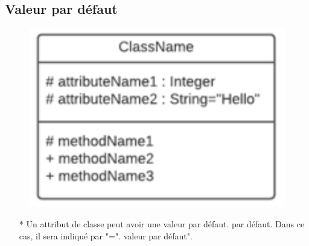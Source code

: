 \documentclass[12pt]{article}
\begin{document}
\subsection{Valeur par défaut}
\begin{figure}[!hbtp]
	\centering
	\includegraphics[scale=0.75]{Capture4.PNG}
\end{figure}
\begin{itemize}
	\item[* ] Un attribut de classe peut avoir une valeur par défaut.
	par défaut. Dans ce cas, il sera indiqué par "=".
	valeur par défaut".
\end{itemize}
\end{document}
